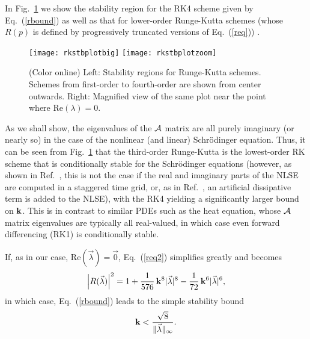 \documentclass{article}
\begin{document}
In Fig.~\ref{f:rk4stb} we show the stability region for the RK4 scheme given by Eq.~(\ref{rbound}) as well as that for lower-order Runge-Kutta schemes (whose $R(p)$ is defined by progressively truncated versions of Eq.~(\ref{req})) \cite{RK4_STB_BOOK}.
\begin{figure}[htbp]
\centering
\texttt{[image: rkstbplotbig]}
\texttt{[image: rkstbplotzoom]}
\caption[Runge-Kutta stability regions.]{(Color online) Left:  Stability regions for Runge-Kutta schemes. Schemes from first-order to fourth-order are shown from center outwards. Right:  Magnified view of the same plot near the point where $\mbox{Re}(\lambda) = 0$.\label{f:rk4stb}}
\end{figure}
As we shall show, the eigenvalues of the $\cal A$ matrix are all purely imaginary (or nearly so) in the case of the nonlinear (and linear) Schr{\"o}dinger equation. Thus, it can be seen from Fig.~\ref{f:rk4stb} that the third-order Runge-Kutta is the lowest-order RK scheme that is conditionally stable for the Schr{\"o}dinger equations (however, as shown in Ref.~\cite{FD_NLSEGP_EXP_STB}, this is not the case if the real and imaginary parts of the NLSE are computed in a staggered time grid, or, as in Ref.~\cite{FD_STBNLSEDISS}, an artificial dissipative term is added to the NLSE), with the RK4 yielding a significantly larger bound on ${\bf k}$.  This is in contrast to similar PDEs such as the heat equation, whose $\cal A$ matrix eigenvalues are typically all real-valued, in which case even forward differencing (RK1) is conditionally stable.

If, as in our case, $\mbox{Re}(\vec \lambda)=\vec 0$, Eq.~(\ref{req2}) simplifies greatly and becomes
\begin{equation}
\label{req3}
\left|R(\vec \lambda)\right|^2 = 1 + \frac {1}{576}\,{\bf k}^8|\vec \lambda|^8-\frac{1}{72}\,{\bf k}^6|\vec \lambda|^6,
\end{equation}
in which case, Eq.~(\ref{rbound}) leads to the simple stability bound
\begin{equation}
\label{rk4stbeasy}
{\bf k} < \frac{\sqrt{8}}{\lVert\vec \lambda\rVert_\infty}.
\end{equation}
\end{document}
